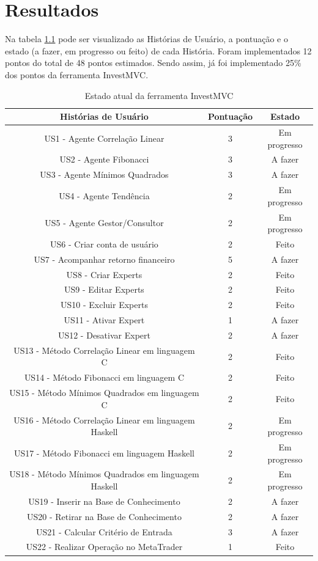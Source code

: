 \chapter{Resultados}

Na tabela \ref{estadoAtual} pode ser visualizado as Histórias de Usuário, a pontuação e o estado (a fazer, em progresso ou feito) de cada História. Foram implementados 12 pontos do total de 48 pontos estimados. Sendo assim, já foi implementado 25\% dos pontos da ferramenta InvestMVC.

\begin{table}[H]
\caption{Estado atual da ferramenta InvestMVC}
\begin{center}
    \begin{tabular}{ | c | c | c |}
    \hline
    \textbf{Histórias de Usuário} & \textbf{Pontuação} & \textbf{Estado} \\ \hline

US1 - Agente Correlação Linear & 3 & Em progresso\\ \hline
US2 - Agente Fibonacci & 3 & A fazer \\ \hline
US3 - Agente Mínimos Quadrados & 3 & A fazer\\ \hline
US4 -  Agente Tendência & 2 & Em progresso\\ \hline
US5 - Agente Gestor/Consultor & 2& Em progresso\\ \hline
US6 - Criar conta de usuário & 2 & Feito\\ \hline
US7 - Acompanhar retorno financeiro & 5 & A fazer\\ \hline
US8 - Criar Experts & 2 & Feito\\ \hline
US9 - Editar Experts & 2 & Feito\\ \hline
US10 - Excluir Experts & 2 & Feito\\ \hline
US11 - Ativar Expert & 1 & A fazer\\ \hline
US12 - Desativar Expert & 2 & A fazer \\ \hline
US13 - Método Correlação Linear em linguagem C & 2 & Feito\\ \hline
US14 - Método Fibonacci em linguagem C & 2 & Feito\\ \hline
US15 - Método Mínimos Quadrados em linguagem C & 2 & Feito\\ \hline
US16 - Método Correlação Linear em linguagem Haskell & 2 & Em progresso\\ \hline
US17 - Método Fibonacci em linguagem Haskell & 2 & Em progresso\\ \hline
US18 - Método Mínimos Quadrados em linguagem Haskell & 2 & Em progresso\\ \hline
US19 - Inserir na Base de Conhecimento & 2 & A fazer\\ \hline
US20 - Retirar na Base de Conhecimento & 2 & A fazer\\ \hline
US21 - Calcular Critério de Entrada & 3 & A fazer\\ \hline
US22 - Realizar Operação no MetaTrader& 1 & Feito\\ \hline
\end{tabular}
\end{center}
\label{estadoAtual}
\end{table}

